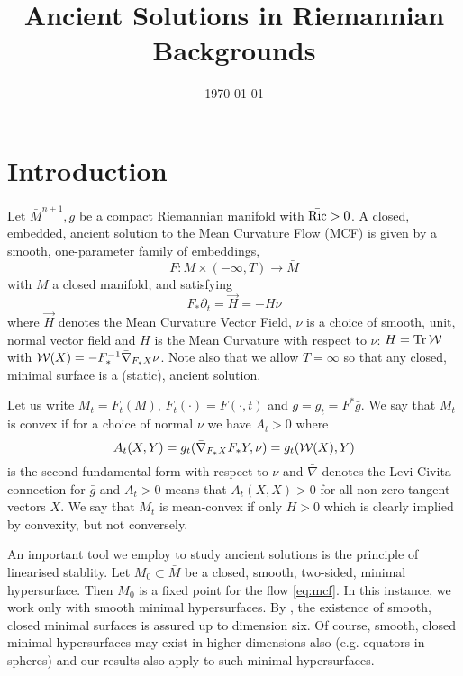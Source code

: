 \documentclass{amsart}
\begin{document}
\title[Ancient Solutions]
 {Ancient Solutions in Riemannian Backgrounds}

\curraddr{}
\email{}
\date{\today}

\dedicatory{}
\subjclass[2010]{}
\keywords{}

\begin{abstract}
\end{abstract}

\maketitle

\section{Introduction}
\label{sec:intro}

Let \(\bar{M}^{n+1}, \bar{g}\) be a compact Riemannian manifold with \(\bar{\operatorname{Ric}} > 0\). A closed, embedded, ancient solution to the Mean Curvature Flow (MCF) is given by a smooth, one-parameter family of embeddings,
\[
F : M \times (-\infty, T) \to \bar{M}
\]
with \(M\) a closed manifold, and satisfying
\begin{equation}
\label{eq:mcf}
F_{\ast} \partial_t = \vec{H} = -H\nu
\end{equation}
where \(\vec{H}\) denotes the Mean Curvature Vector Field, \(\nu\) is a choice of smooth, unit, normal vector field and \(H\) is the Mean Curvature with respect to \(\nu\): \(H = \operatorname{Tr} \operatorname{\mathcal{W}}\) with \(\operatorname{\mathcal{W}} (X) = -F_{\ast}^{-1} \bar{\nabla}_{F_{\ast} X} \nu\). Note also that we allow \(T = \infty\) so that any closed, minimal surface is a (static), ancient solution.

Let us write \(M_t = F_t(M)\), \(F_t (\cdot) = F(\cdot, t)\) and \(g = g_t = F^{\ast} \bar{g}\). We say that \(M_t\) is convex if for a choice of normal \(\nu\) we have \(A_t>0\) where
\[
A_t (X, Y) = g_t (\bar{\nabla}_{F_{\ast} X} F_{\ast} Y, \nu) = g_t(\operatorname{\mathcal{W}}(X), Y)
\]
is the second fundamental form with respect to \(\nu\) and \(\bar{\nabla}\) denotes the Levi-Civita connection for \(\bar{g}\) and \(A_t > 0\) means that \(A_t(X, X) > 0\) for all non-zero tangent vectors \(X\). We say that \(M_t\) is mean-convex if only \(H > 0\) which is clearly implied by convexity, but not conversely.

An important tool we employ to study ancient solutions is the principle of linearised stablity. Let \(M_0 \subset \bar{M}\) be a closed, smooth, two-sided, minimal hypersurface. Then \(M_0\) is a fixed point for the flow \eqref{eq:mcf}. In this instance, we work only with smooth minimal hypersurfaces. By \cite{pitts:/1983}, the existence of smooth, closed minimal surfaces is assured up to dimension six. Of course, smooth, closed minimal hypersurfaces may exist in higher dimensions also (e.g. equators in spheres) and our results also apply to such minimal hypersurfaces.
\end{document}
